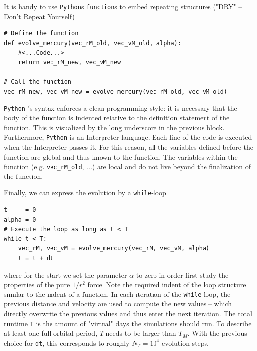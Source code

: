 \documentclass[12pt]{iopart}
\newcommand{\python}[0]{\texttt{Python} }
\begin{document}
It is handy to use \texttt{Python}s \texttt{function}s to embed repeating structures ("DRY" -- Don't Repeat Yourself)
\begin{lstlisting}
# Define the function
def evolve_mercury(vec_rM_old, vec_vM_old, alpha):
	#<...Code...>
	return vec_rM_new, vec_vM_new

# Call the function
vec_rM_new, vec_vM_new = evolve_mercury(vec_rM_old, vec_vM_old)
\end{lstlisting}
\python{$\!'$}s syntax enforces a clean programming style: it is necessary that the body of the function is indented relative to the definition statement of the function.
This is visualized by the long underscore in the previous block.
Furthermore, \python is an Interpreter language.
Each line of the code is executed when the Interpreter passes it.
For this reason, all the variables defined before the function are global and thus known to the function.
The variables within the function (e.g. \texttt{vec\_rM\_old}, ...) are local and do not live beyond the finalization of the function.

Finally, we can express the evolution by a \texttt{while}-loop 
\begin{lstlisting}
t     = 0
alpha = 0
# Execute the loop as long as t < T
while t < T:
	vec_rM, vec_vM = evolve_mercury(vec_rM, vec_vM, alpha)
	t = t + dt
\end{lstlisting}
where for the start we set the parameter $\alpha$ to zero in order first study the properties of the pure 
$1/r^2$ force.
Note the required indent of the loop structure similar to the indent of a function.
In each iteration of the \texttt{while}-loop, the previous distance and velocity are used to compute the new values -- which directly overwrite the previous values and thus enter the next iteration.  The total runtime \texttt{T} is the amount of "virtual" days the simulations should run.
To describe at least one full orbital period, $T$ needs to be larger than $T_M$.
With the previous choice for \texttt{dt}, this corresponds to roughly $N_T = 10^4$ evolution steps.


\end{document}
